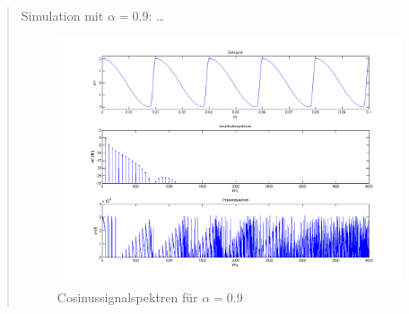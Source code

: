 \begin{quote}
\begin{center}
		\end{center}
		
		\vspace{1em}
		
		Simulation mit $\alpha = 0.9$: \ldots
		
		\begin{center}
	    
	           \begin{figure}[H]
    			\centering
                    \includegraphics[scale=0.5]{cos_alpha9}
    			\caption{Cosinussignalspektren für $\alpha = 0.9$}
    			\end{figure}	
		
		\end{center}
		
	\end{quote}
	
